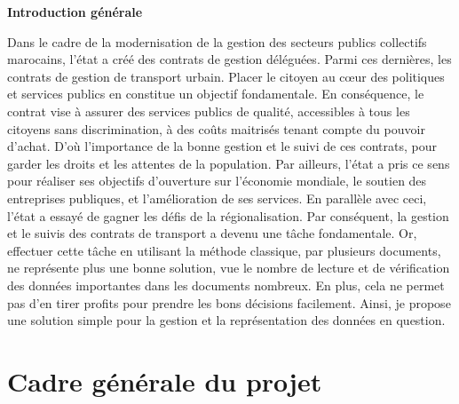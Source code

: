 \documentclass[a4paper]{report}
\begin{document}
\listoffigures
\newpage
{}
\begin{doublespace}
    \begin{center}
        \vspace*{1cm}
        \textbf{\huge{Introduction générale}}
    \end{center}
\end{doublespace}
\begin{doublespace}
    \renewcommand{\headrulewidth}{1pt}
    \fancyhead[L]{\hspace*{5cm}}
    Dans le cadre de la modernisation de la gestion des secteurs publics
    collectifs
    marocains, l’état a créé des contrats de gestion déléguées. Parmi ces
    dernières, les
    contrats de gestion de transport urbain. Placer le citoyen au cœur des
    politiques et
    services publics en constitue un objectif fondamentale. En conséquence, le
    contrat
    vise à assurer des services publics de qualité, accessibles à tous les
    citoyens sans discrimination, à des coûts maitrisés tenant compte du
    pouvoir
    d’achat. D'où  l'importance de la bonne gestion et le suivi de ces
    contrats, pour garder
    les droits et les attentes de la population.
    Par ailleurs, l’état a pris ce sens pour réaliser ses objectifs d’ouverture
    sur l’économie
    mondiale, le soutien des entreprises publiques, et l’amélioration de ses
    services.
    En parallèle avec ceci, l’état a essayé de gagner les défis de la
    régionalisation.
    Par conséquent, la gestion et le suivis des contrats de transport a devenu
    une tâche
    fondamentale. Or, effectuer cette tâche en utilisant la méthode classique,
    par plusieurs documents,
    ne représente plus une bonne solution, vue le nombre de lecture et de
    vérification
    des données importantes dans les documents nombreux. En plus, cela ne
    permet pas d’en
    tirer profits pour prendre les bons décisions facilement. Ainsi, je propose
    une
    solution simple pour la gestion et la représentation des données en
    question.
\end{doublespace}

\newpage

\chapter{Cadre générale du projet}
\end{document}
